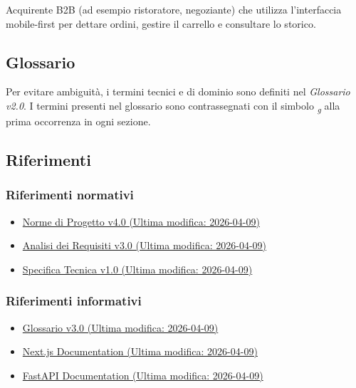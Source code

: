 \begin{description}[style=nextline]
    \item[\textbf{Cliente}] Acquirente B2B (ad esempio ristoratore, negoziante) che utilizza l'interfaccia mobile-first per dettare ordini, gestire il carrello e consultare lo storico.
\end{description}

\subsection{Glossario}
Per evitare ambiguit\`a, i termini tecnici e di dominio sono definiti nel \textit{Glossario v2.0}.
I termini presenti nel glossario sono contrassegnati con il simbolo \textsubscript{\textit{g}} alla prima occorrenza in ogni sezione.

\subsection{Riferimenti}

\subsubsection{Riferimenti normativi}
\begin{itemize}
    \item \href{https://swenightpro.github.io/Documentazione/docs/PB/Documentazione\%20Interna/Norme_Di_Progetto.pdf}{Norme di Progetto v4.0 (Ultima modifica: 2026-04-09)}
    \item \href{https://swenightpro.github.io/Documentazione/docs/PB/Documentazione\%20Esterna/Analisi_Dei_Requisiti.pdf}{Analisi dei Requisiti v3.0 (Ultima modifica: 2026-04-09)}
    \item \href{https://swenightpro.github.io/Documentazione/docs/PB/Documentazione\%20Esterna/Specifica_Tecnica.pdf}{Specifica Tecnica v1.0 (Ultima modifica: 2026-04-09)}
\end{itemize}

\subsubsection{Riferimenti informativi}
\begin{itemize}
    \item \href{https://swenightpro.github.io/Documentazione/docs/PB/Documentazione\%20Esterna/Glossario.pdf}{Glossario v3.0 (Ultima modifica: 2026-04-09)}
    \item \href{https://nextjs.org/docs}{Next.js Documentation (Ultima modifica: 2026-04-09)}
    \item \href{https://fastapi.tiangolo.com}{FastAPI Documentation (Ultima modifica: 2026-04-09)}
\end{itemize}